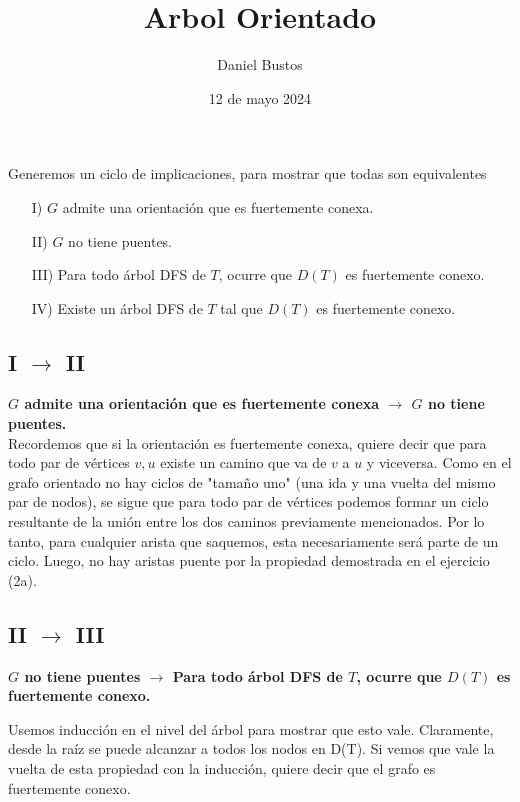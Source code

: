 \documentclass{article}
\begin{document}
\title{Arbol Orientado}
\author{Daniel Bustos}
\date{12 de mayo 2024}
\maketitle

Generemos un ciclo de implicaciones, para mostrar que todas son equivalentes

\begin{enumerate}
    \item[I)] $G$ admite una orientación que es fuertemente conexa.
    \item[II)] $G$ no tiene puentes.
    \item[III)] Para todo árbol DFS de $T$, ocurre que $D(T)$ es fuertemente conexo.
    \item[IV)] Existe un árbol DFS de $T$ tal que $D(T)$ es fuertemente conexo.
\end{enumerate}

\subsection*{I $\rightarrow$ II}

\textbf{$G$ admite una orientación que es fuertemente conexa $\rightarrow$ $G$ no tiene puentes.}\\

Recordemos que si la orientación es fuertemente conexa, quiere decir que para todo par de vértices $v,u$ existe un camino que va de $v$ a $u$ y viceversa. Como en el grafo orientado no hay ciclos de "tamaño uno" (una ida y una vuelta del mismo par de nodos), se sigue que para todo par de vértices podemos formar un ciclo resultante de la unión entre los dos caminos previamente mencionados. Por lo tanto, para cualquier arista que saquemos, esta necesariamente será parte de un ciclo. Luego, no hay aristas puente por la propiedad demostrada en el ejercicio (2a).

\subsection*{II $\rightarrow$ III}

\textbf{$G$ no tiene puentes $\rightarrow$ Para todo árbol DFS de $T$, ocurre que $D(T)$ es fuertemente conexo.}

Usemos inducción en el nivel del árbol para mostrar que esto vale. Claramente, desde la raíz se puede alcanzar a todos los nodos en D(T). Si vemos que vale la vuelta de esta propiedad con la inducción, quiere decir que el grafo es fuertemente conexo.\\
\end{document}
